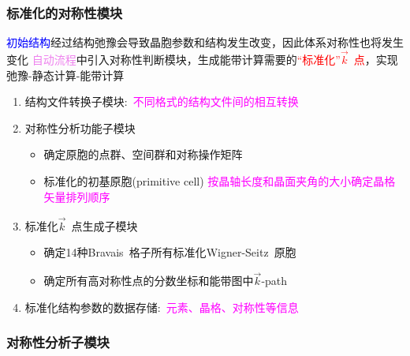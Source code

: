 \documentclass[cjk,slidestop,compress,mathserif,blue]{beamer}
\newcommand{\upcite}[1]{\hspace{0ex}\textsuperscript{\cite{#1}}} %
\begin{document}
\frame
{
	\frametitle{标准化的对称性模块}
	\textcolor{blue}{初始结构}经过结构弛豫会导致晶胞参数和结构发生改变，因此体系对称性也将发生变化
	\vskip 2pt
	\textcolor{violet}{自动流程}中引入对称性判断模块，生成能带计算需要的\textcolor{red}{“标准化”$\vec k$~点}，实现弛豫-静态计算-能带计算
\begin{enumerate}
	\item 结构文件转换子模块:~\textcolor{magenta}{不同格式的结构文件间的相互转换}
	\item 对称性分析功能子模块
		\begin{itemize}
			\item 确定原胞的点群、空间群和对称操作矩阵
			\item 标准化的初基原胞(\textrm{primitive cell})
				\vskip 2pt
				\textcolor{magenta}{按晶轴长度和晶面夹角的大小确定晶格矢量排列顺序}
		\end{itemize}
	\item 标准化$\vec k$~点生成子模块\upcite{CMS49-299_2010}
		\begin{itemize}
			\item 确定14种\textrm{Bravais~}格子所有标准化\textrm{Wigner-Seitz~}原胞
			\item 确定所有高对称性点的分数坐标和能带图中$\vec k$-\textrm{path}
		\end{itemize}
	\item 标准化结构参数的数据存储:~\textcolor{magenta}{元素、晶格、对称性等信息}
\end{enumerate}
}

\frame
{
	\frametitle{对称性分析子模块}
\begin{figure}[h!]
\centering
\hspace*{-0.18in}
\label{Procedure_Symmetry_Sgroup}
\end{figure}
}
\end{document}
